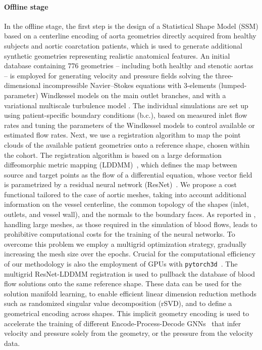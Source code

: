 \paragraph*{Offline stage} In the offline stage, the first step is the design of a Statistical Shape Model (SSM) based on a centerline encoding of aorta geometries directly acquired from healthy subjects and aortic coarctation patients, which is used to generate additional synthetic geometries representing realistic anatomical features. An initial database containing 776 
geometries -- including both healthy and stenotic aortas -- is employed for generating velocity and pressure fields solving the three-dimensional
incompressible Navier--Stokes equations with 3-elements (lumped-parameter) Windkessel models on the main outlet branches, and with a variational multiscale turbulence model \cite{bazilevs2007variational}. The individual simulations are set up using patient-specific boundary conditions (b.c.),
based on measured inlet flow rates and tuning the parameters of the Windkessel models to control available or estimated flow rates.
%
Next, we use a registration algorithm to map the point clouds of the available patient geometries onto a reference shape, chosen within the cohort.
The registration algorithm is based on a large deformation diffeomorphic metric mapping (LDDMM)~\cite{trouve1998diffeomorphisms, trouve2005local}, which defines
the map between source and target points as the flow of a differential equation, whose vector field is parametrized by a residual neural network (ResNet)~\cite{amor2022resnet}.
%
We propose a cost functional tailored to the case of aortic meshes, taking into account additional information on the vessel centerline, the common topology of the shapes (inlet, outlets, and vessel wall),
and the normals to the boundary faces. 
%
As reported in \cite{pajaziti2023shape}, handling large meshes, as those required in the simulation of blood flows, leads to prohibitive computational costs for the training of the neural networks.
To overcome this problem we employ a multigrid optimization strategy, gradually
increasing the mesh size over the epochs. 
%
Crucial for the computational efficiency of our methodology is also the employment of GPUs with \texttt{pytorch3d}~\cite{ravi2020pytorch3d}. 
%
The multigrid ResNet-LDDMM registration is used to pullback the database of blood flow solutions onto the same reference shape. These data can be used for the solution manifold learning, to enable efficient linear dimension reduction methods such as randomized singular value decomposition (rSVD), and to define a geometrical encoding across shapes.
This implicit geometry encoding is used to accelerate the training of different Encode-Process-Decode GNNs~\cite{pfaff2020learning} that infer velocity and pressure solely from the geometry, or the pressure from the velocity data.

